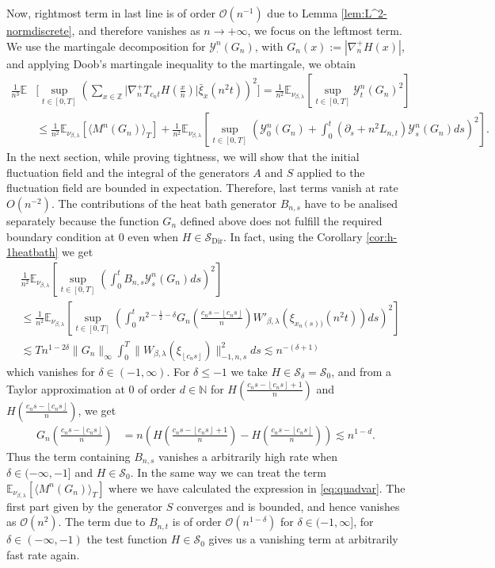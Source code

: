 \documentclass[a4paper, reqno, 12pt]{amsart}
\theoremstyle{plain}
\theoremstyle{definition}
\newcommand{\floor}[1]{\left\lfloor #1 \right\rfloor}
\newcommand{\ee}[1]{\mathbb{E}_{\nu_{\beta,\lambda}}\left[ #1 \right]}
\newcommand{\Z}{\mathbb{Z}}
\newcommand{\N}{\mathbb{N}}
\newcommand{\Sdir}{\mathcal{S}_{\text{Dir}}}
\begin{document}
Now, rightmost term in last line is of order $\mathcal{O}(n^{-1})$ due to Lemma \ref{lem:L^2-normdiscrete}, and therefore vanishes as $n\to+\infty$, we focus on the leftmost term. We use the martingale decomposition for $\mathcal Y^n_\cdot (G_n)$, with $G_n(x):= |\nabla^+_n H(x)|$, and applying Doob's martingale inequality to the martingale, we obtain 
\begin{align*}
    \frac{1}{n^3} \mathbb E &\Bigg[\sup_{t\in[0,T]} \left( \sum_{x\in\Z} \bigg|\nabla_n^+T_{c_nt}H\left(\frac{x}{n}\right)\bigg| \bar{\xi}_{x}(n^2t) \right)^2 \Bigg] = \frac{1}{n^2} \ee{\sup_{t\in[0,T]} \mathcal{Y}^n_t(G_n)^2} \\
    & \leq \frac{1}{n^2} \ee{\langle M^n(G_n)\rangle_T} + \frac{1}{n^2} \ee{\sup_{t\in[0,T]} \left(\mathcal{Y}^n_0(G_n) + \int_0^t (\partial_s + n^2L_{n,t})\mathcal{Y}^n_s(G_n) ds\right)^2}.
\end{align*}
In the next section, while proving tightness, we will show that the initial fluctuation field and the integral of the generators $A$ and $S$ applied to the fluctuation field are bounded in expectation. 
Therefore, last terms vanish at rate $O(n^{-2})$. 
The contributions of the heat bath generator $B_{n,s}$ have to be analised  separately because the function $G_n$ defined above does not fulfill the required  boundary condition at $0$ even when $H\in\Sdir$. In fact, using the Corollary \ref{cor:h-1heatbath} we get
\begin{align*}
    &\frac{1}{n^2}\ee{\sup_{t\in[0,T]} \left(\int_0^t B_{n,s}\mathcal{Y}^n_s(G_n)ds\right)^2} \\
    &\leq \frac{1}{n^2}\ee{\sup_{t\in[0,T]} \left(\int_0^t n^{2-\frac{1}{2}-\delta} G_n \left(\frac{c_ns - \floor{c_ns}}{n}\right)W'_{\beta,\lambda}(\xi_{x_n(s))}(n^2t))  ds\right)^2}\\
    & \lesssim T n^{1-2\delta}\|G_n\|_{\infty} \int_0^T \|W_{\beta,\lambda}(\xi_{\floor{c_ns}})\|^2_{-1,n,s}ds  \lesssim n^{-(\delta + 1)}
\end{align*}
which vanishes for $\delta\in(-1,\infty)$. For $\delta\leq -1$ we take $H\in\mathcal S_{\delta } = \mathcal{S}_0$, and from a Taylor approximation at $0$ of order $d\in\N$ for $H\left(\frac{c_ns - \floor{c_ns}+1}{n}\right)$ and $H\left(\frac{c_ns - \floor{c_ns}}{n}\right)$, we get 
\begin{align*}
    G_n\left(\frac{c_ns - \floor{c_ns}}{n}\right) &= n\left( H\left(\frac{c_ns - \floor{c_ns}+1}{n}\right) -H\left(\frac{c_ns - \floor{c_ns}}{n}\right)\right) \lesssim n^{1-d}.
\end{align*}
Thus the term containing $B_{n,s}$ vanishes a arbitrarily high rate when $\delta\in (-\infty,-1]$ and $H\in\mathcal{S}_0$.
In the same way we can treat the term $\ee{\langle M^n(G_n)\rangle_T}$ where we have calculated the expression in \eqref{eq:quadvar}.  The first part given by the generator $S$ converges and is bounded, and hence vanishes as $\mathcal{O}(n^2)$. The term due to $B_{n,t}$ is of order $\mathcal{O}(n^{1-\delta})$ for $\delta \in (-1,\infty]$, for $\delta\in (-\infty,-1)$ the test function $H\in\mathcal S_0$ gives us a vanishing term at arbitrarily fast rate again.
\end{document}
